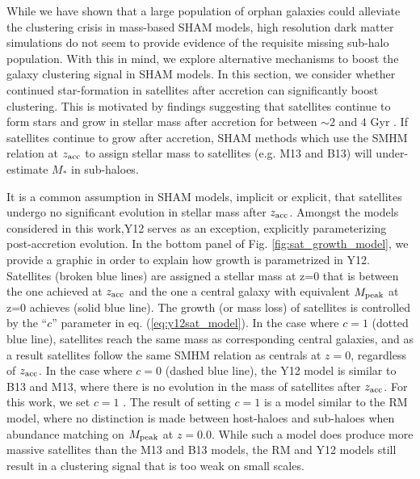 \documentclass[useAMS,fleqn,usenatbib]{mnras}
\begin{document}
While we have shown that a large population of orphan galaxies could alleviate the clustering crisis in mass-based SHAM models, high resolution dark matter simulations do not seem to provide evidence of the requisite missing sub-halo population.  With this in mind, we explore alternative mechanisms to boost the galaxy clustering signal in SHAM models.  In this section, we consider whether continued star-formation in satellites after accretion can significantly boost clustering.  This is motivated by findings suggesting that satellites continue to form stars and grow in stellar mass after accretion for between $\sim 2$ and $4$ Gyr \citep{Wetzel:2013dw}.  If satellites continue to grow after accretion, SHAM methods which use the SMHM relation at $z_{\rm acc}$ to assign stellar mass to satellites (e.g. M13 and B13) will under-estimate $M_*$ in sub-haloes.

It is a common assumption in SHAM models, implicit or explicit, that satellites undergo no significant evolution in stellar mass after $z_{\rm acc}$.  Amongst the models considered in this work,Y12 serves as an exception, explicitly parameterizing post-accretion evolution.  In the bottom panel of Fig. \ref{fig:sat_growth_model}, we provide a graphic in order to explain how growth is parametrized in Y12.  Satellites (broken blue lines) are assigned a stellar mass at z=0 that is between the one achieved at $z_{\rm acc}$ and the one a central galaxy with equivalent $M_{\rm peak}$ at z=0 achieves (solid blue line).  The growth (or mass loss) of satellites is controlled by the ``$c$'' parameter in eq. (\ref{eq:y12sat_model}).  In the case where $c=1$ (dotted blue line), satellites reach the same mass as corresponding central galaxies, and as a result satellites follow the same SMHM relation as centrals at $z=0$, regardless of $z_{\rm acc}$.  In the case where $c=0$ (dashed blue line), the Y12 model is similar to B13 and M13, where there is no evolution in the mass of satellites after $z_{\rm acc}$.  For this work, we set $c = 1$ \citep[consistent with SMF2 FIT-2PCF in table 4 in][]{Yang:2012ew}.  The result of setting $c = 1$ is a model similar to the RM model, where no distinction is made between host-haloes and sub-haloes when abundance matching on $M_{\rm peak}$ at $z=0.0$.  While such a model does produce more massive satellites than the M13 and B13 models, the RM and Y12 models still result in a clustering signal that is too weak on small scales.
\end{document}
